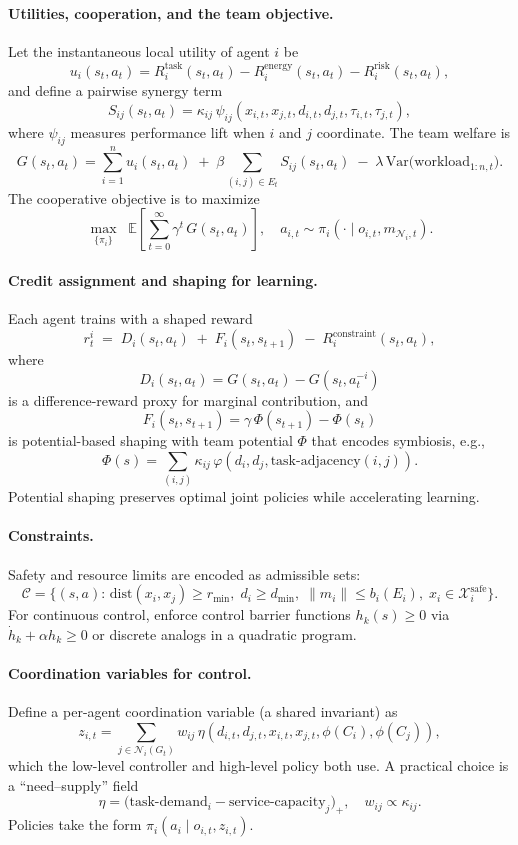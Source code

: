 \paragraph{Utilities, cooperation, and the team objective.}
Let the instantaneous local utility of agent $i$ be
\[
u_i(s_t,a_t)=R^{\text{task}}_i(s_t,a_t)-R^{\text{energy}}_i(s_t,a_t)-R^{\text{risk}}_i(s_t,a_t),
\]
and define a pairwise synergy term
\[
S_{ij}(s_t,a_t)=\kappa_{ij}\,\psi_{ij}\!\left(x_{i,t},x_{j,t},d_{i,t},d_{j,t},\tau_{i,t},\tau_{j,t}\right),
\]
where $\psi_{ij}$ measures performance lift when $i$ and $j$ coordinate.
The team welfare is
\[
G(s_t,a_t)=\sum_{i=1}^n u_i(s_t,a_t) \;+\; \beta \sum_{(i,j)\in E_t} S_{ij}(s_t,a_t) \;-\; \lambda\,\mathrm{Var}\!\big(\text{workload}_{1:n,t}\big).
\]
The cooperative objective is to maximize
\[
\max_{\{\pi_i\}} \;\; \mathbb{E}\!\left[\sum_{t=0}^{\infty}\gamma^t\, G(s_t,a_t)\right],
\quad a_{i,t}\sim \pi_i(\cdot\mid o_{i,t},m_{\mathcal{N}_i,t}).
\]

\paragraph{Credit assignment and shaping for learning.}
Each agent trains with a shaped reward
\[
r^i_t \;=\; D_i(s_t,a_t)\;+\;F_i(s_t,s_{t+1})\;-\;R^{\text{constraint}}_i(s_t,a_t),
\]
where
\[
D_i(s_t,a_t)=G(s_t,a_t)-G(s_t,a_t^{-i})
\]
is a difference-reward proxy for marginal contribution, and
\[
F_i(s_t,s_{t+1})=\gamma\,\Phi(s_{t+1})-\Phi(s_t)
\]
is potential-based shaping with team potential $\Phi$ that encodes symbiosis, e.g.,
\[
\Phi(s)=\sum_{(i,j)} \kappa_{ij}\,\varphi\!\left(d_{i},d_{j},\text{task-adjacency}(i,j)\right).
\]
Potential shaping preserves optimal joint policies while accelerating learning.

\paragraph{Constraints.}
Safety and resource limits are encoded as admissible sets:
\[
\mathcal{C}=\Big\{(s,a):\, \mathrm{dist}(x_{i},x_{j})\ge r_{\min},\;
d_{i}\ge d_{\min},\;
\|m_{i}\|\le b_i(E_i),\;
x_i\in\mathcal{X}^{\text{safe}}_i\Big\}.
\]
For continuous control, enforce control barrier functions $h_k(s)\ge 0$ via
$\dot h_k+\alpha h_k\ge 0$ or discrete analogs in a quadratic program.

\paragraph{Coordination variables for control.}
Define a per-agent coordination variable (a shared invariant) as
\[
z_{i,t} = \sum_{j\in\mathcal{N}_i(G_t)} w_{ij}\,\eta\!\left(d_{i,t},d_{j,t},x_{i,t},x_{j,t},\phi(C_i),\phi(C_j)\right),
\]
which the low-level controller and high-level policy both use.
A practical choice is a “need–supply” field
\[
\eta=\big(\text{task-demand}_i-\text{service-capacity}_j\big)_+,
\quad w_{ij}\propto \kappa_{ij}.
\]
Policies take the form $\pi_i(a_i\mid o_{i,t},z_{i,t})$.

